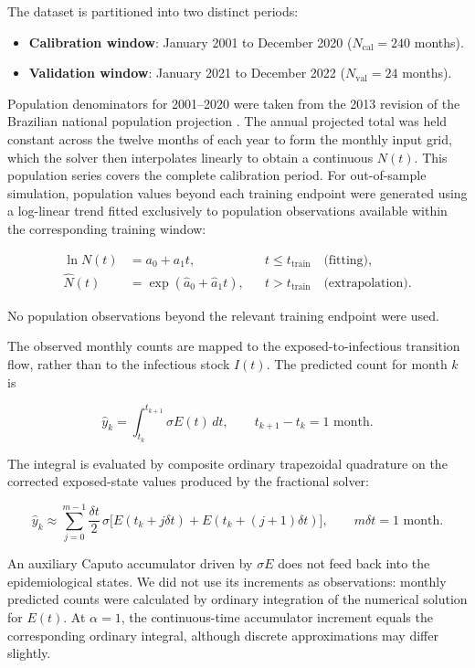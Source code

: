 \documentclass[pdflatex,sn-mathphys-ay]{sn-jnl}
\begin{document}
The dataset is partitioned into two distinct periods:

\begin{itemize}
\item \textbf{Calibration window}: January 2001 to December 2020 ($N_{\text{cal}} = 240$ months).
\item \textbf{Validation window}: January 2021 to December 2022 ($N_{\text{val}} = 24$ months).
\end{itemize}

Population denominators for 2001--2020 were taken from the 2013 revision of the Brazilian national population projection \citep{ibge2013}. The annual projected total was held constant across the twelve months of each year to form the monthly input grid, which the solver then interpolates linearly to obtain a continuous $N(t)$. This population series covers the complete calibration period. For out-of-sample simulation, population values beyond each training endpoint were generated using a log-linear trend fitted exclusively to population observations available within the corresponding training window:

\[
\begin{aligned}
\ln N(t)&=a_0+a_1t, &&t\le t_{\mathrm{train}}\quad\text{(fitting)},\\
\widehat N(t)&=\exp(\widehat a_0+\widehat a_1t), &&t>t_{\mathrm{train}}\quad\text{(extrapolation)}.
\end{aligned}
\]

No population observations beyond the relevant training endpoint were used.

The observed monthly counts are mapped to the exposed-to-infectious transition flow, rather than to the infectious stock $I(t)$. The predicted count for month $k$ is

\[
\widehat y_k=\int_{t_k}^{t_{k+1}}\sigma E(t)\,dt,\qquad t_{k+1}-t_k=1\text{ month}.
\]

The integral is evaluated by composite ordinary trapezoidal quadrature on the corrected exposed-state values produced by the fractional solver:

\[
\widehat y_k\approx\sum_{j=0}^{m-1}\frac{\delta t}{2}\,\sigma\bigl[E(t_k+j\delta t)+E(t_k+(j+1)\delta t)\bigr],\qquad m\delta t=1\text{ month}.
\]

An auxiliary Caputo accumulator driven by $\sigma E$ does not feed back into the epidemiological states. We did not use its increments as observations: monthly predicted counts were calculated by ordinary integration of the numerical solution for $E(t)$. At $\alpha=1$, the continuous-time accumulator increment equals the corresponding ordinary integral, although discrete approximations may differ slightly.
\end{document}
